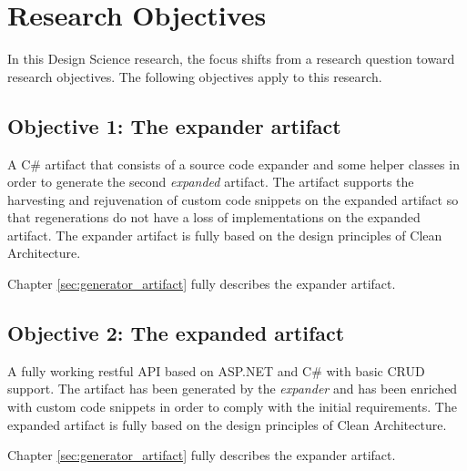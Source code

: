 \section{Research Objectives} \label{sec:research_objectives}

In this Design Science research, the focus shifts from a research question toward
research objectives. The following objectives apply to this research.

\subsection*{Objective 1: The expander artifact}
A C\# artifact that consists of a source code expander and some helper classes in order to
generate the second \emph{expanded} artifact. The artifact supports the harvesting and
rejuvenation of custom code snippets on the expanded artifact so that regenerations do not
have a loss of implementations on the expanded artifact. The expander artifact is fully
based on the design principles of Clean Architecture.

Chapter \ref{sec:generator_artifact} fully describes the expander artifact.

\subsection*{Objective 2: The expanded artifact}
A fully working restful API based on ASP.NET and C\# with basic CRUD support. The artifact
has been generated by the \emph{expander} and has been enriched with custom code snippets
in order to comply with the initial requirements. The expanded artifact is fully based on
the design principles of Clean Architecture.

Chapter \ref{sec:generator_artifact} fully describes the expander artifact.

